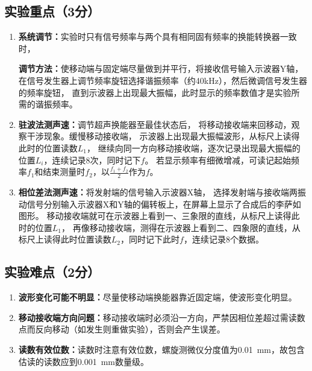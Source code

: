 \documentclass{../template/Report}
\begin{document}
\subsection{实验重点（3分）}
\begin{enumerate}
	\item \textbf{系统调节：}实验时只有信号频率与两个具有相同固有频率的换能转换器一致时，

	      \textbf{调节方法：}使移动端与固定端尽量做到并平行，将接收信号输入示波器Y轴，
	      在信号发生器上调节频率旋钮选择谐振频率（约40\si{\kilo\hertz}），然后微调信号发生器的频率旋钮，
	      直到示波器上出现最大振幅，此时显示的频率数值才是实验所需的谐振频率。

	\item \textbf{驻波法测声速：}调节超声换能器至最佳状态后，
	      将移动接收端来回移动，观察干涉现象。缓慢移动接收端，
	      示波器上出现最大振幅波形，从标尺上读得此时的位置读数$L_1$，
	      继续向同一方向移动接收端，逐次记录出现最大振幅的位置$L_i$，连续记录8次，同时记下$f$。
	      若显示频率有细微增减，可读记起始频率$f_1$和结束测量时$f_2$，以$\frac{f_1+f_2}{2}$作为$f$。

	\item \textbf{相位差法测声速：}将发射端的信号输入示波器X轴，
	      选择发射端与接收端两振动信号分别输入示波器X和Y轴的偏转板上，在屏幕上显示了合成后的李萨如图形。
	      移动接收端就可在示波器上看到一、三象限的直线，从标尺上读得此时的位置$L_1$，
	      再像移动接收端，测得在示波器上看到二、四象限的直线，从标尺上读得此时位置读数$L_2$，同时记下此时$f$，连续记录8个数据。
\end{enumerate}
\subsection{实验难点（2分）}
\begin{enumerate}
	\item \textbf{波形变化可能不明显：}尽量使移动端换能器靠近固定端，使波形变化明显。
	\item \textbf{移动接收端方向问题：}移动接收端时必须沿一方向，严禁因相位差超过需读数点而反向移动（如发生则重做实验），否则会产生误差。
	\item \textbf{读数有效位数：}读数时注意有效位数，螺旋测微仪分度值为\SI{0.01}{\mm}，故包含估读的读数应到\SI{0.001}{\mm}数量级。
\end{enumerate}
\end{document}
